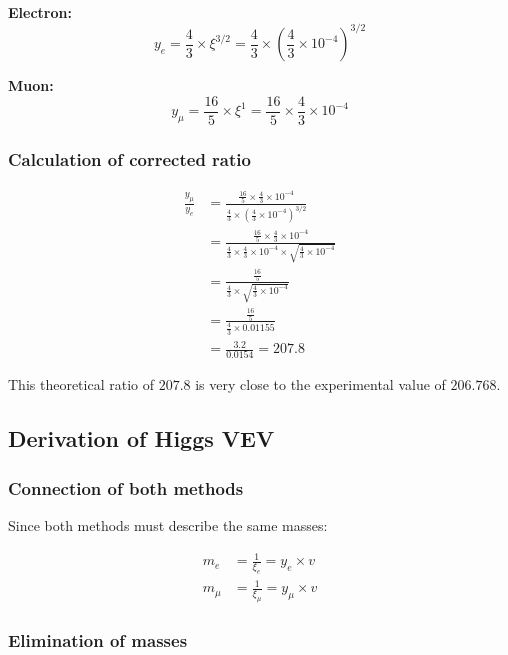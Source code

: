 \textbf{Electron:}
\begin{equation}
	y_e = \frac{4}{3} \times \xi^{3/2} = \frac{4}{3} \times \left(\frac{4}{3} \times 10^{-4}\right)^{3/2}
\end{equation}

\textbf{Muon:}
\begin{equation}
	y_\mu = \frac{16}{5} \times \xi^1 = \frac{16}{5} \times \frac{4}{3} \times 10^{-4}
\end{equation}

\subsubsection{Calculation of corrected ratio}

\begin{align}
	\frac{y_\mu}{y_e} &= \frac{\frac{16}{5} \times \frac{4}{3} \times 10^{-4}}{\frac{4}{3} \times \left(\frac{4}{3} \times 10^{-4}\right)^{3/2}}\\
	&= \frac{\frac{16}{5} \times \frac{4}{3} \times 10^{-4}}{\frac{4}{3} \times \frac{4}{3} \times 10^{-4} \times \sqrt{\frac{4}{3} \times 10^{-4}}}\\
	&= \frac{\frac{16}{5}}{\frac{4}{3} \times \sqrt{\frac{4}{3} \times 10^{-4}}}\\
	&= \frac{\frac{16}{5}}{\frac{4}{3} \times 0.01155}\\
	&= \frac{3.2}{0.0154} = 207.8
\end{align}

This theoretical ratio of $207.8$ is very close to the experimental value of $206.768$.

\subsection{Derivation of Higgs VEV}

\subsubsection{Connection of both methods}

Since both methods must describe the same masses:

\begin{align}
	m_e &= \frac{1}{\xi_e} = y_e \times v\\
	m_\mu &= \frac{1}{\xi_\mu} = y_\mu \times v
\end{align}

\subsubsection{Elimination of masses}

